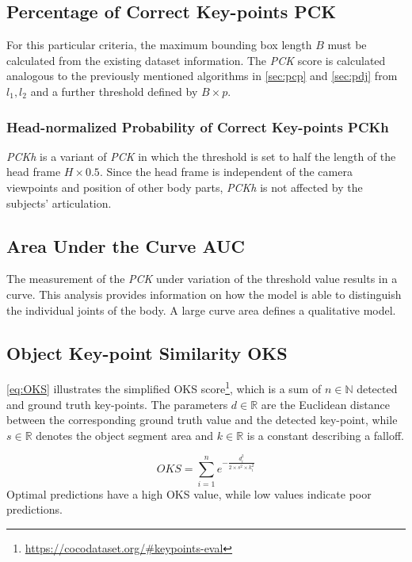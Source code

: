 \subsection{Percentage of Correct Key-points PCK}
For this particular criteria, the maximum bounding box length $B$ must be calculated from the existing dataset information. The \emph{PCK} score is calculated analogous to the previously mentioned algorithms in \autoref{sec:pcp} and \autoref{sec:pdj} from $l_{1}, l_{2}$ and a further threshold defined by $B \times p$. \cite{mpii, pck}

\subsubsection{Head-normalized Probability of Correct Key-points PCKh}
\emph{PCKh} is a variant of \emph{PCK} in which the threshold is set to half the length of the head frame $H \times 0.5$. Since the head frame is independent of the camera viewpoints and position of other body parts, \emph{PCKh} is not affected by the subjects' articulation. \cite{mpii}

\subsection{Area Under the Curve AUC}
The measurement of the \emph{PCK} under variation of the threshold value results in a curve. This analysis provides information on how the model is able to distinguish the individual joints of the body. A large curve area defines a qualitative model. \cite{auc}

\subsection{Object Key-point Similarity OKS}
\autoref{eq:OKS} illustrates the simplified OKS score\footnote{\url{https://cocodataset.org/\#keypoints-eval}}, which is a sum of $ n \in \mathbb{N}$ detected and ground truth key-points. The parameters $d \in \mathbb{R}$ are the Euclidean distance between the corresponding ground truth value and the detected key-point, while $s \in \mathbb{R}$ denotes the object segment area and $k \in \mathbb{R}$ is a constant describing a falloff. 

\begin{equation}
    \label{eq:OKS}
    OKS = \sum_{i=1}^{n} e^{- \frac{d_{i}^{2}}{2 \times s^{2} \times k_{i}^{2}}}
\end{equation}
Optimal predictions have a high OKS value, while low values indicate poor predictions. 

